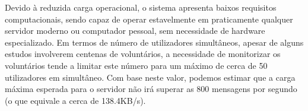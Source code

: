 Devido à reduzida carga operacional, o sistema apresenta baixos requisitos computacionais, sendo capaz de operar estavelmente em praticamente qualquer servidor moderno ou computador pessoal, sem necessidade de hardware especializado.
Em termos de número de utilizadores simultâneos, apesar de alguns estudos involverem centenas de voluntários, a necessidade de monitorizar os voluntários tende a limitar este número para um máximo de cerca de 50 utilizadores em simultâneo. Com base neste valor, podemos estimar que a carga máxima esperada para o servidor não irá superar as 800 mensagens por segundo (o que equivale a cerca de 138.4KB/s). 